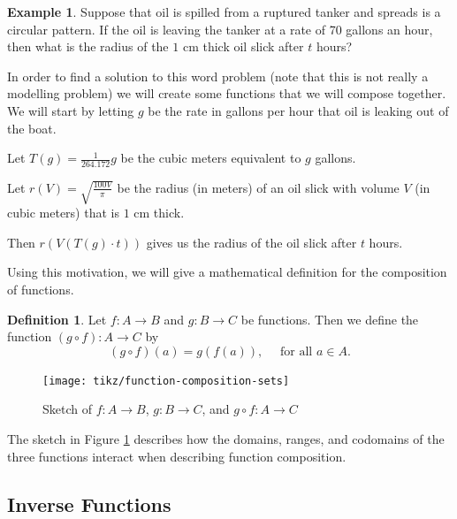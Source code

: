 \documentclass[
]{book}
\theoremstyle{definition}
\newtheorem{definition}{Definition}[chapter]
\theoremstyle{definition}
\newtheorem{example}{Example}[chapter]
\theoremstyle{definition}
\theoremstyle{remark}
\begin{document}
\begin{example}
\protect\hypertarget{exm:unnamed-chunk-138}{}{\label{exm:unnamed-chunk-138} }Suppose that oil is spilled from a ruptured tanker and spreads is a circular pattern. If the oil is leaving the tanker at a rate of 70 gallons an hour, then what is the radius of the \(1\) cm thick oil slick after \(t\) hours?

In order to find a solution to this word problem (note that this is not really a modelling problem) we will create some functions that we will compose together. We will start by letting \(g\) be the rate in gallons per hour that oil is leaking out of the boat.

Let \(T(g)=\frac{1}{264.172} g\) be the cubic meters equivalent to \(g\) gallons.

Let \(r(V)= \sqrt{\frac{100V}{\pi}}\) be the radius (in meters) of an oil slick with volume \(V\) (in cubic meters) that is \(1\) cm thick.

Then \(r(V(T(g)\cdot t))\) gives us the radius of the oil slick after \(t\) hours.
\end{example}

Using this motivation, we will give a mathematical definition for the composition of functions.

\begin{definition}
\protect\hypertarget{def:unnamed-chunk-139}{}{\label{def:unnamed-chunk-139} }Let \(f:A\rightarrow B\) and \(g: B \rightarrow C\) be functions. Then we define the function \((g\circ f):A\rightarrow C\) by \[(g\circ f) (a)= g(f(a)), \quad \mbox{ for all } a \in A.\]
\end{definition}

\begin{figure}

{\centering \texttt{[image: tikz/function-composition-sets]} 

}

\caption{Sketch of $f:A \rightarrow B$, $g:B \rightarrow C$, and $g \circ f: A \rightarrow C$}\label{fig:function-composition}
\end{figure}

The sketch in Figure \ref{fig:function-composition} describes how the domains, ranges, and codomains of the three functions interact when describing function composition.

\hypertarget{inverse-functions}{%
\subsection{Inverse Functions}\label{inverse-functions}}
\end{document}

